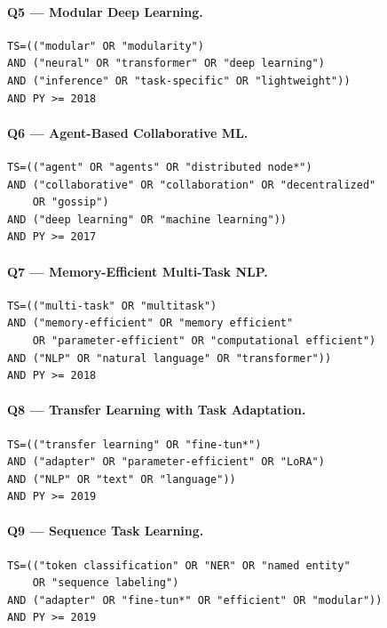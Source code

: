 \paragraph{Q5 — Modular Deep Learning.}
\begin{verbatim}
TS=(("modular" OR "modularity")
AND ("neural" OR "transformer" OR "deep learning")
AND ("inference" OR "task-specific" OR "lightweight"))
AND PY >= 2018
\end{verbatim}

\paragraph{Q6 — Agent-Based Collaborative ML.}
\begin{verbatim}
TS=(("agent" OR "agents" OR "distributed node*")
AND ("collaborative" OR "collaboration" OR "decentralized"
    OR "gossip")
AND ("deep learning" OR "machine learning"))
AND PY >= 2017
\end{verbatim}

\paragraph{Q7 — Memory-Efficient Multi-Task NLP.}
\begin{verbatim}
TS=(("multi-task" OR "multitask")
AND ("memory-efficient" OR "memory efficient"
    OR "parameter-efficient" OR "computational efficient")
AND ("NLP" OR "natural language" OR "transformer"))
AND PY >= 2018
\end{verbatim}

\paragraph{Q8 — Transfer Learning with Task Adaptation.}
\begin{verbatim}
TS=(("transfer learning" OR "fine-tun*")
AND ("adapter" OR "parameter-efficient" OR "LoRA")
AND ("NLP" OR "text" OR "language"))
AND PY >= 2019
\end{verbatim}

\paragraph{Q9 — Sequence Task Learning.}
\begin{verbatim}
TS=(("token classification" OR "NER" OR "named entity"
    OR "sequence labeling")
AND ("adapter" OR "fine-tun*" OR "efficient" OR "modular"))
AND PY >= 2019
\end{verbatim}

